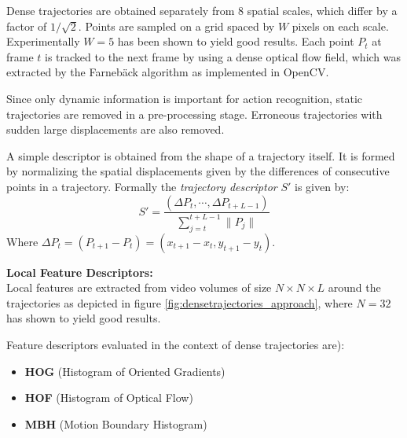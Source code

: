 Dense trajectories are obtained separately from 8 spatial scales, which differ by a factor of $1 / \sqrt{2}$.
Points are sampled on a grid spaced by $W$ pixels on each scale. Experimentally $W = 5$ has been shown to yield good results.
Each point $P_t$ at frame $t$ is tracked to the next frame by using a dense optical flow field, which was extracted by the Farnebäck algorithm \cite{farneback_two-frame_2003} as implemented in OpenCV.

Since only dynamic information is important for action recognition, static trajectories are removed in a pre-processing stage.
Erroneous trajectories with sudden large displacements are also removed.

A simple descriptor is obtained from the shape of a trajectory itself.
It is formed by normalizing the spatial displacements given by the differences of consecutive points in a trajectory.
Formally the \textit{trajectory descriptor} $S'$ is given by:
\begin{equation*}
    S' = \frac{(\Delta P_t, \cdots, \Delta P_{t+L-1})}{\sum_{j=t}^{t+L-1} \|P_j\|}
\end{equation*}
Where $\Delta P_t = (P_{t+1} - P_t) = (x_{t+1} - x_t, y_{t+1} - y_t)$.

\textbf{Local Feature Descriptors:}\\
Local features are extracted from video volumes of size $N \times N \times L$ around the trajectories as depicted in figure \ref{fig:densetrajectories_approach}, where $N = 32$ has shown to yield good results.

Feature descriptors evaluated in the context of dense trajectories are):
\begin{itemize}
    \item \textbf{HOG} (Histogram of Oriented Gradients) \cite{dalal_histograms_2005-1}
    \item \textbf{HOF} (Histogram of Optical Flow) \cite{laptev_learning_2008}
    \item \textbf{MBH} (Motion Boundary Histogram) \cite{dalal_human_2006}
\end{itemize}

